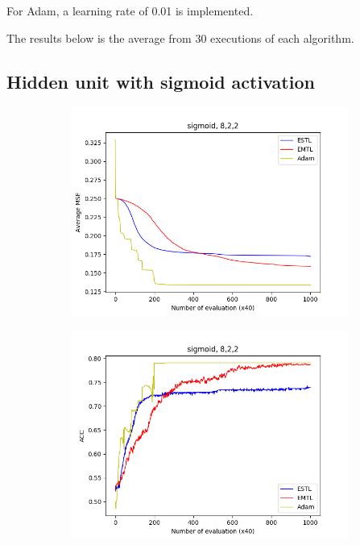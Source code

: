 \documentclass[conference]{IEEEtran}
\theoremstyle{definition}
\begin{document}
  For Adam, a learning rate of 0.01 is implemented.

  The results below is the average from 30 executions of each algorithm.

  \subsection{Hidden unit with sigmoid activation}
    \begin{figure}
      \centering
      \begin{subfigure}{0.48\linewidth}
        \centering
        \includegraphics[width=1.0\linewidth]{images/sigmoid/avg_mse8,2,2.png}
      \end{subfigure}
      \begin{subfigure}{0.48\linewidth}
        \centering
        \includegraphics[width=1.0\linewidth]{images/sigmoid/avg_acc8,2,2.png}
      \end{subfigure}


\end{figure}
\end{document}
